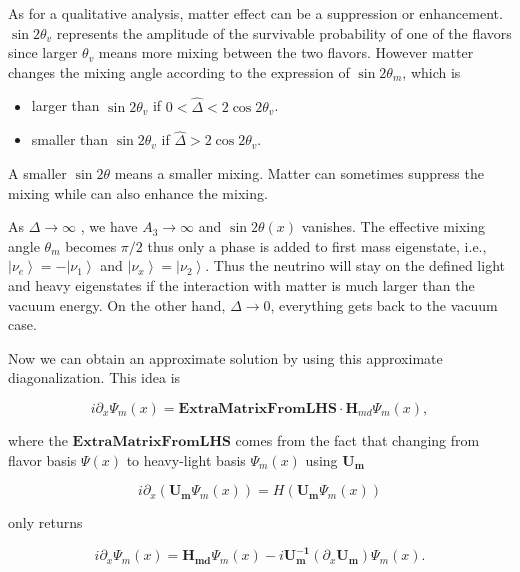 \documentclass{tufte-handout}
\newcommand{\ket}[1]{\left| #1\right\rangle}
\begin{document}
{\color{red}As for a qualitative analysis, matter effect can be a suppression or enhancement. $\sin 2\theta_v$ represents the amplitude of the survivable probability of one of the flavors since larger $\theta_v$ means more mixing between the two flavors. However matter changes the mixing angle according to the expression of $\sin 2\theta_m$, which is

\begin{itemize}
\item larger than $\sin 2\theta_v$ if $ 0 < \hat\Delta < 2\cos 2\theta_v$.
\item smaller than $\sin 2\theta_v$ if $\hat\Delta > 2\cos 2\theta_v$.
\end{itemize}

A smaller $\sin2\theta$ means a smaller mixing. Matter can sometimes suppress the mixing while can also enhance the mixing.}



As  $\Delta \to \infty$ ,  we have $A_3\to \infty$ and  $\sin 2\theta(x)$ vanishes. The effective mixing angle $\theta_m$ becomes $\pi/2$ thus only a phase is added to first mass eigenstate, i.e., $\ket{\nu_e}=-\ket{\nu_1}$ and $\ket{\nu_x}=\ket{\nu_2}$. Thus the neutrino will stay on the defined light and heavy eigenstates if the interaction with matter is much larger than the vacuum energy. On the other hand, $\Delta \to 0$, everything gets back to the vacuum case.

Now we can obtain an approximate solution by using this approximate diagonalization. This idea is

\begin{equation*}
i \partial_x \Psi_m(x) = \mathbf{Extra Matrix From LHS}\cdot \mathbf H_{md} \Psi_m(x),
\end{equation*}

where the $\mathbf{Extra Matrix From LHS}$ comes from the fact that changing from flavor basis $\Psi(x)$ to heavy-light basis $\Psi_m(x)$ using $\mathbf {U_m}$

\begin{equation*}
i\partial_x (\mathbf{U_m} \Psi_m(x)) = H ( \mathbf{U_m} \Psi_m(x) )
\end{equation*}

only returns

\begin{equation*}
i\partial_x \Psi_m(x) = \mathbf{H_{md} } \Psi_m(x) - i \mathbf{U_m^{-1}} ( \partial_x \mathbf{U_m} ) \Psi_m(x).
\end{equation*}
\end{document}
